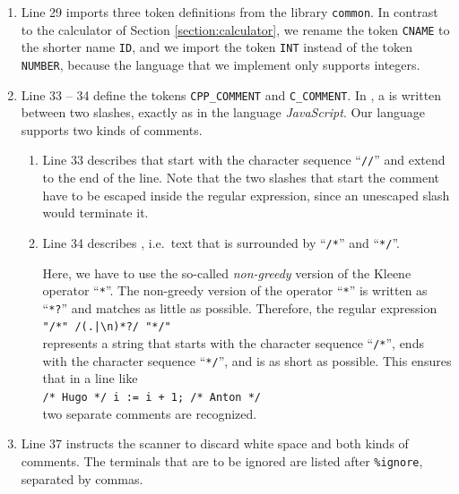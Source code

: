 \begin{enumerate}
      form $f(a_1, \cdots\!, a_n)$ is represented as the tuple
      \\[0.2cm]
      \hspace*{1.3cm}
      \texttt{('call', ('ID', $f$), $a_1$, $\cdots$, $a_n$)}.
\item Line 29 imports three token definitions from the library \texttt{common}.  In contrast to the
      calculator of Section \ref{section:calculator}, we rename the token \texttt{CNAME} to the shorter name
      \texttt{ID}, and we import the token \texttt{INT} instead of the token \texttt{NUMBER}, because the
      language that we implement only supports integers.
\item Line 33 -- 34 define the tokens \texttt{CPP\_COMMENT} and \texttt{C\_COMMENT}.  In ,
      a  is written between two slashes, exactly as in the language
      \textsl{JavaScript}.  Our language supports two kinds of comments.
      \begin{enumerate}
      \item Line 33 describes  that start with the character sequence
            ``\texttt{//}'' and extend to the end of the line.  Note that the two slashes that start the
            comment have to be escaped inside the regular expression, since an unescaped slash would
            terminate it.
      \item Line 34 describes , i.e.~text that is surrounded by ``\texttt{/*}''
            and ``\texttt{*/}''.

            Here, we have to use the so-called \emph{non-greedy} version of the Kleene operator
            ``\texttt{*}''.  The non-greedy version of the operator ``\texttt{*}'' is written as
            ``\texttt{*?}'' and matches as little as possible.  Therefore, the regular expression
            \\[0.2cm]
            \hspace*{1.3cm}
            \verb$"/*" /(.|\n)*?/ "*/"$ %
            \\[0.2cm]
            represents a string that starts with the character sequence ``\texttt{/*}'', ends with the
            character sequence ``\texttt{*/}'', and is as short as possible.  This ensures that in a line
            like
            \\[0.2cm]
            \hspace*{1.3cm}
            \texttt{/* Hugo */ i := i + 1; /* Anton */}
            \\[0.2cm]
            two separate comments are recognized.
      \end{enumerate}
\item Line 37 instructs the scanner to discard white space and both kinds of comments.  The terminals that
      are to be ignored are listed after \texttt{\%ignore}, separated by commas.
\end{enumerate}
